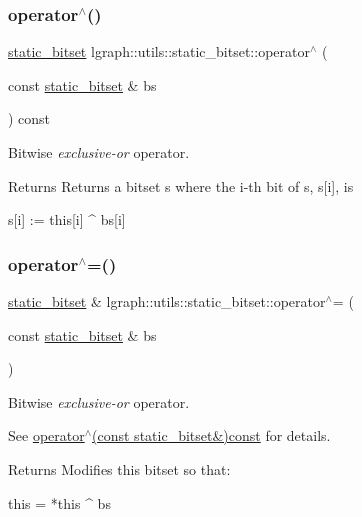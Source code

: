 \subsubsection{\texorpdfstring{operator$^\wedge$()}{operator^()}}
{\footnotesize\ttfamily \hyperlink{classlgraph_1_1utils_1_1static__bitset}{static\+\_\+bitset} lgraph\+::utils\+::static\+\_\+bitset\+::operator$^\wedge$ (\begin{DoxyParamCaption}\item[{const \hyperlink{classlgraph_1_1utils_1_1static__bitset}{static\+\_\+bitset} \&}]{bs }\end{DoxyParamCaption}) const}



Bitwise {\itshape exclusive-\/or} operator. 

\begin{DoxyReturn}{Returns}
Returns a bitset s where the i-\/th bit of s, s\mbox{[}i\mbox{]}, is \begin{DoxyVerb}s[i] := this[i] ^ bs[i]\end{DoxyVerb}
 
\end{DoxyReturn}
\mbox{\label{classlgraph_1_1utils_1_1static__bitset_a2f07c03e35d9a5661cf573ed1eb379a6}} 
\subsubsection{\texorpdfstring{operator$^\wedge$=()}{operator^=()}}
{\footnotesize\ttfamily \hyperlink{classlgraph_1_1utils_1_1static__bitset}{static\+\_\+bitset} \& lgraph\+::utils\+::static\+\_\+bitset\+::operator$^\wedge$= (\begin{DoxyParamCaption}\item[{const \hyperlink{classlgraph_1_1utils_1_1static__bitset}{static\+\_\+bitset} \&}]{bs }\end{DoxyParamCaption})}



Bitwise {\itshape exclusive-\/or} operator. 

See \hyperlink{classlgraph_1_1utils_1_1static__bitset_a5d4ca0e342e0b0094f20925a62b2068d}{operator$^\wedge$(const static\+\_\+bitset\&)const} for details. \begin{DoxyReturn}{Returns}
Modifies this bitset so that\+: \begin{DoxyVerb}this = *this ^ bs\end{DoxyVerb}
 
\end{DoxyReturn}
\mbox{\label{classlgraph_1_1utils_1_1static__bitset_a8b0ee09d74157739ac96995b6a07b29f}} 

